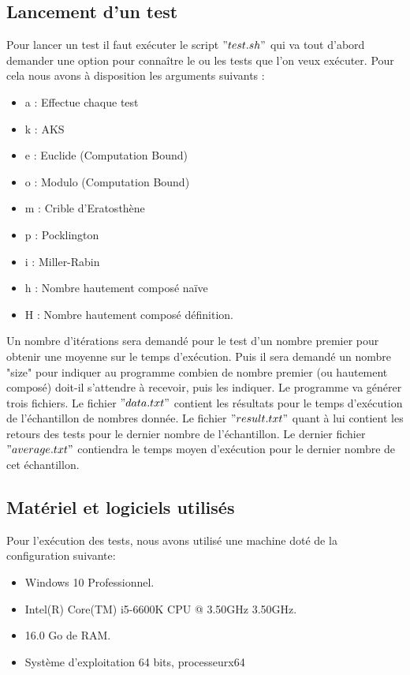 		\subsection{Lancement d'un test}
	Pour lancer un test il faut exécuter le script $"test.sh"$ qui va tout d'abord demander une option pour connaître le ou les tests que l'on veux exécuter. Pour cela nous avons à disposition les arguments suivants : 
	\begin{itemize}
		\item a : Effectue chaque test
		\item k : AKS
		\item e : Euclide (Computation Bound)
		\item o : Modulo (Computation Bound)
		\item m : Crible d'Eratosthène
		\item p : Pocklington
		\item i : Miller-Rabin
		\item h : Nombre hautement composé naïve
		\item H : Nombre hautement composé définition.
	\end{itemize}
	
Un nombre d'itérations sera demandé pour le test d'un nombre premier pour obtenir une moyenne sur le temps d'exécution. Puis il sera demandé un nombre "size" pour indiquer au programme combien de nombre premier (ou hautement composé) doit-il s'attendre à recevoir, puis les indiquer. Le programme va générer trois fichiers. Le fichier $"data.txt"$ contient les résultats pour le temps d'exécution de l'échantillon de nombres donnée. Le fichier $"result.txt"$ quant à lui contient les retours des tests pour le dernier nombre de l'échantillon. Le dernier fichier $"average.txt"$ contiendra le temps moyen d'exécution pour le dernier nombre de cet échantillon.
		\subsection{Matériel et logiciels utilisés}
		Pour l'exécution des tests, nous avons utilisé une machine doté de la configuration suivante:
		\begin{itemize}
		\item Windows 10 Professionnel.
		\item Intel(R) Core(TM) i5-6600K CPU @ 3.50GHz 3.50GHz.
		\item 16.0 Go de RAM.
		\item Système d'exploitation 64 bits, processeurx64
		\end{itemize}
		
